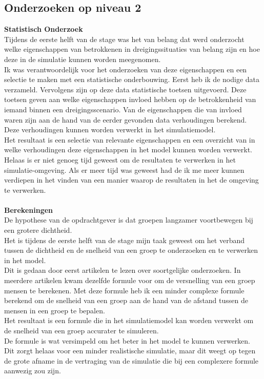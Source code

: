 \documentclass[12pt, letterpaper]{article}
\begin{document}
\begin{appendices}
\subsection{Onderzoeken op niveau 2}
\textbf{Statistisch Onderzoek}\\
Tijdens de eerste helft van de stage was het van belang dat werd onderzocht welke eigenschappen van betrokkenen in dreigingssituaties van belang zijn en hoe deze in de simulatie kunnen worden meegenomen.\\
Ik was verantwoordelijk voor het onderzoeken van deze eigenschappen en een selectie te maken met een statistische onderbouwing.
Eerst heb ik de nodige data verzameld. Vervolgens zijn op deze data statistische toetsen uitgevoerd. Deze toetsen geven aan welke eigenschappen invloed hebben op de betrokkenheid van iemand binnen een dreigingsscenario. Van de eigenschappen die van invloed waren zijn aan de hand van de eerder gevonden data verhoudingen berekend. Deze verhoudingen kunnen worden verwerkt in het simulatiemodel.\\
Het resultaat is een selectie van relevante eigenschappen en een overzicht van in welke verhoudingen deze eigenschappen in het model kunnen worden verwerkt.\\
Helaas is er niet genoeg tijd geweest om de resultaten te verwerken in het simulatie-omgeving. Als er meer tijd was geweest had de ik me meer kunnen verdiepen in het vinden van een manier waarop de resultaten in het de omgeving te verwerken.\\
\\
\textbf{Berekeningen} \\
De hypothese van de opdrachtgever is dat groepen langzamer voortbewegen bij een grotere dichtheid.\\
Het is tijdens de eerste helft van de stage mijn taak geweest om het verband tussen de dichtheid en de snelheid van een groep te onderzoeken en te verwerken in het model.\\
Dit is gedaan door eerst artikelen te lezen over soortgelijke onderzoeken. In meerdere artikelen kwam dezelfde formule voor om de versnelling van een groep mensen te berekenen. Met deze formule heb ik een minder complexe formule berekend om de snelheid van een groep aan de hand van de afstand tussen de mensen in een groep te bepalen.\\
Het resultaat is een formule die in het simulatiemodel kan worden verwerkt om de snelheid van een groep accurater te simuleren.\\
De formule is wat versimpeld om het beter in het model te kunnen verwerken. Dit zorgt helaas voor een minder realistische simulatie, maar dit weegt op tegen de grote afname in de vertraging van de simulatie die bij een complexere formule aanwezig zou zijn.\\

\end{appendices}
\end{document}
